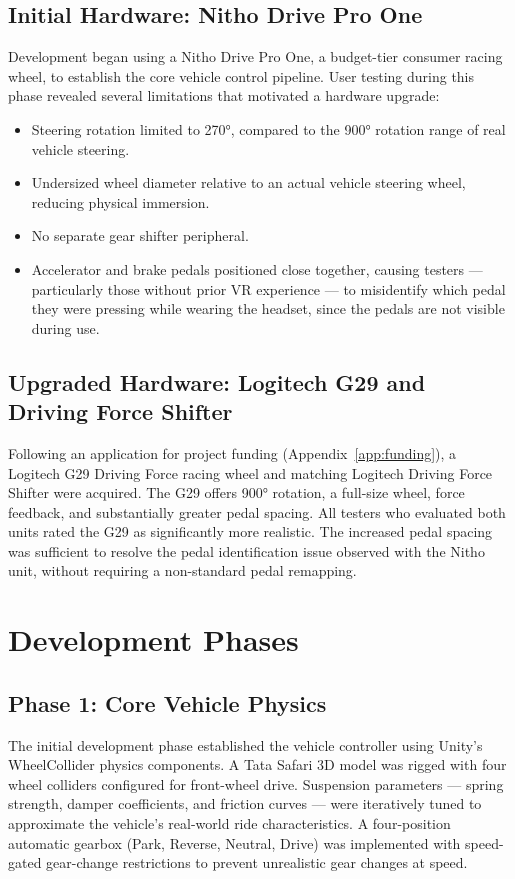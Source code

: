 \subsection{Initial Hardware: Nitho Drive Pro One}
Development began using a Nitho Drive Pro One, a budget-tier consumer racing wheel, to establish the core vehicle control pipeline. User testing during this phase revealed several limitations that motivated a hardware upgrade:
\begin{itemize}
    \item Steering rotation limited to 270°, compared to the 900° rotation range of real vehicle steering.
    \item Undersized wheel diameter relative to an actual vehicle steering wheel, reducing physical immersion.
    \item No separate gear shifter peripheral.
    \item Accelerator and brake pedals positioned close together, causing testers — particularly those without prior VR experience — to misidentify which pedal they were pressing while wearing the headset, since the pedals are not visible during use.
\end{itemize}

\subsection{Upgraded Hardware: Logitech G29 and Driving Force Shifter}
Following an application for project funding (Appendix~\ref{app:funding}), a Logitech G29 Driving Force racing wheel and matching Logitech Driving Force Shifter were acquired. The G29 offers 900° rotation, a full-size wheel, force feedback, and substantially greater pedal spacing. All testers who evaluated both units rated the G29 as significantly more realistic. The increased pedal spacing was sufficient to resolve the pedal identification issue observed with the Nitho unit, without requiring a non-standard pedal remapping.

\section{Development Phases}

\subsection{Phase 1: Core Vehicle Physics}
The initial development phase established the vehicle controller using Unity's WheelCollider physics components. A Tata Safari 3D model was rigged with four wheel colliders configured for front-wheel drive. Suspension parameters — spring strength, damper coefficients, and friction curves — were iteratively tuned to approximate the vehicle's real-world ride characteristics. A four-position automatic gearbox (Park, Reverse, Neutral, Drive) was implemented with speed-gated gear-change restrictions to prevent unrealistic gear changes at speed.


